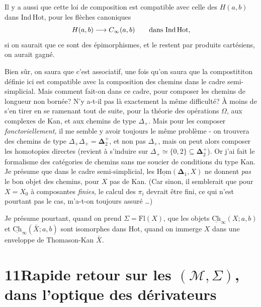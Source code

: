 \documentclass[11pt]{article}
\newcommand{\printedpage}[1]{\marginpar{\footnotesize p.~#1}}
\newcommand{\msp}[1]{\marginpar{\footnotesize [#1]}}
\newcommand{\Ch}{\underline{\mathrm{Ch}}}
\newcommand{\uHom}{\underline{\mathrm{Hom}}}
\begin{document}
\clearpage
\printedpage{80}

Il y a aussi que cette loi de composition est compatible avec celle des $H(a,b)$ dans Ind\,Hot, pour les flèches canoniques
\[ H(a,b)\longrightarrow C_\infty(a,b) \qquad \text{dans Ind\,Hot}, \]
si on saurait que ce sont des épimorphismes, et le restent par produits cartésiens, on aurait gagné.

Bien sûr, on saura que c'est associatif, une fois qu'on saura que la compostititon définie ici est compatible avec la composition des chemins dans le cadre semi-simplicial. Mais comment fait-on dans ce cadre, pour composer les chemins de longueur non bornée? N'y a-t-il pas là exactement la même difficulté? À moins de s'en %
\msp{page 128}
tirer en se ramenant tout de suite, pour la théorie des opérations $\Omega$, aux complexes de Kan, et aux chemins de type $\Delta_+$. Mais pour les composer \textit{fonctoriellement,} il me semble y avoir toujours le même problème - on trouvera des chemins de type $\Delta_+\Delta_+ = \boldsymbol{\Delta}_2^+$, et non pas $\Delta_+$, mais on peut alors composer les homotopies directes (revient à s'induire sur $\Delta_+\simeq\{0,2\}\subseteq\boldsymbol{\Delta}_2^+$). Or j'ai fait le formalisme des catégories de chemins sans me soucier de conditions du type Kan. Je présume que dans le cadre semi-simplicial, les $\uHom(\boldsymbol{\Delta}_1,X)$ ne donnent \textit{pas} le bon objet des chemins, pour $X$ pas de Kan. (Car sinon, il semblerait que pour $X=X_0$ à composantes \textit{finies,} le calcul des $\pi_i$ devrait être fini, ce qui n'est pourtant pas le cas, m'a-t-on toujours assuré \dots)

Je présume pourtant, quand on prend $\Sigma=\mathrm{Fl}(X)$, que les objets $\Ch_\infty(X;a,b)$ et $\Ch_\infty(\bar{X};a,b)$ sont isomorphes dans Hot, quand on immerge $X$ dans une enveloppe de Thomason-Kan $\bar{X}$.

\clearpage
\printedpage{81}

\msp{page 129}

\section*{11\quad Rapide retour sur les $(\mathcal{M},\Sigma)$, dans l'optique des dérivateurs}
\end{document}

